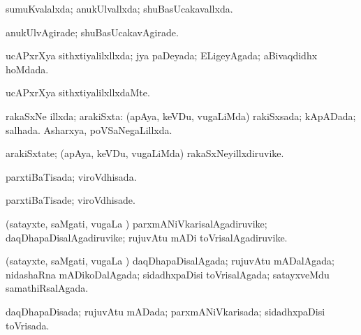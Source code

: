{{\bentry
{} 
\gl{\gu}
\expl{}
\bmng
sumuKvalalxda; anukUlvallxda; shuBasUcakavallxda. 
\emng
\eentry

\bentry
{} 
\gl{\kirxvi}
\expl{}
\bmng
anukUlvAgirade; shuBasUcakavAgirade. 
\emng
\eentry

\bentry
{} 
\gl{\gu}
\expl{}
\bmng
ucAPxrXya sithxtiyalilxllxda; jya paDeyada; ELigeyAgada; aBivaqdidhx hoMdada. 
\emng
\eentry

\bentry
{} 
\gl{\kirxvi}
\expl{}
\bmng
ucAPxrXya sithxtiyalilxllxdaMte. 
\emng
\eentry

\bentry
{} 
\gl{\gu}
\expl{}
\bmng
rakaSxNe illxda; arakiSxta: 
\banum
{} (apAya, keVDu, \mo vugaLiMda) rakiSxsada; kApADada; salhada. 
 Asharxya, poVSaNegaLillxda. 
\eanum
\emng
\eentry

\bentry
{} 
\gl{\nA}
\expl{}
\bmng
arakiSxtate; (apAya, keVDu, \mo vugaLiMda) rakaSxNeyillxdiruvike. 
\emng
\eentry

\bentry
{} 
\gl{\gu}
\expl{}
\bmng
parxtiBaTisada; viroVdhisada. 
\emng
\eentry

\bentry
{} 
\gl{\kirxvi}
\expl{}
\bmng
parxtiBaTisade; viroVdhisade. 
\emng
\eentry

\bentry
{} 
\gl{\nA}
\expl{}
\bmng
(satayxte, saMgati, \mo vugaLa \vi) parxmANiVkarisalAgadiruvike; daqDhapaDisalAgadiruvike; rujuvAtu mADi toVrisalAgadiruvike. 
\emng
\eentry

\bentry
{} 
\gl{\gu}
\expl{}
\bmng
(satayxte, saMgati, \mo vugaLa \vi) daqDhapaDisalAgada; rujuvAtu mADalAgada; nidashaRna mADikoDalAgada; sidadhxpaDisi toVrisalAgada; satayxveMdu samathiRsalAgada. 
\emng
\eentry

\bentry
{} 
\gl{\nA}
\expl{}
\bmng
{} 
\emng
\eentry

\bentry
{} 
\gl{\gu}
\expl{}
\bmng
daqDhapaDisada; rujuvAtu mADada; parxmANiVkarisada; sidadhxpaDisi toVrisada. 
\emng
\eentry

\bentry
{} 
\gl{\gu}
\expl{}
\bmng
{} 
\emng
\eentry

}}
